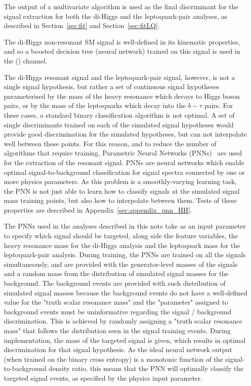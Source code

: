 The output of a multivariate algorithm is used as the final discriminant for the signal extraction for both the di-Higgs and the leptoquark-pair analyses, as described in Section~\ref{sec:fit} and Section~\ref{sec:fitLQ}. 

The di-Higgs non-resonant SM signal is well-defined in its kinematic properties, and so a boosted decision tree (neural network) trained on this signal is used in the \hadhad (\lephad) channel. 

The di-Higgs resonant signal and the leptoquark-pair signal, however, is not a single signal hypothesis, but rather a set of continuous signal hypotheses parameterised by the mass of the heavy resonance which decays to Higgs boson pairs, or by the mass of the leptoquarks which decay into the $b-\tau$ pairs. For these cases, a standard binary classification algorithm is not optimal. A set of single discriminants trained on each of the simulated signal hypotheses would provide good discrimination for the simulated hypotheses, but can not interpolate well between these points. For this reason, and to reduce the number of algorithms that require training, Parametric Neural Networks (PNNs)~\cite{Baldi:2016fzo} are used for the extraction of the resonant signal. PNNs are neural networks which enable optimal signal-to-background classification for signal spectra connected by one or more physics parameters. As this problem is a smoothly-varying learning task, the PNN is not just able to learn how to classify signals at the simulated signal mass training points, but also how to interpolate between them. Tests of these properties are described in Appendix~\ref{sec:appendix_pnn_HH}.

The PNNs used in the analyses described in this note take as an input parameter to specify which signal should be targeted, along side the feature variables, the heavy resonance mass for the di-Higgs analysis and the leptoquark mass for the leptoquark-pair analysis. During training, the PNNs are trained on all the signals simultaneously, and are provided with the generator-level masses of the signals and a random mass from the distribution of simulated signal masses for the background. The background events are provided with such distribution of simulated signal masses because the background events do not have a well-defined value for the "truth scalar resonance mass" and the "parameter" assigned to background events must be uninformative regarding the signal / background discrimination. This is achieved by randomly assigning a "truth scalar resonance mass" that follows the distribution seen in the signal training events. During implementation, the mass of the targeted signal is given, which results in optimal discrimination for that signal hypothesis. As the ideal neural network output (when trained on the binary cross entropy) is a monotonic function of the signal-to-background density ratio, this means that the PNN will optimally classify the targeted signal events, as specified by the physics input parameter.

